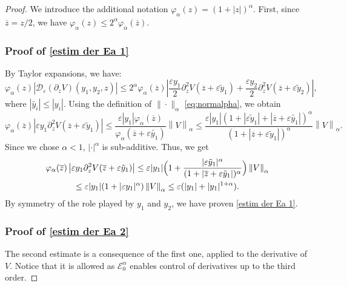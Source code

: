 \documentclass[10pt]{amsart}
\let\mathcal\mathscr
\theoremstyle{plain}
\theoremstyle{definition}
\newcommand{\D}{\mathcal{D}_\eps}
\let\eps\varepsilon
\newcommand{\abs}[1]{\left\lvert#1\right\rvert}
\newcommand{\nalph}[1]{\left\lVert#1\right\rVert_\alpha}
\newcommand{\Eaz}{\mathcal{E}^\alpha_0}
\newcommand{\bz}{\overline{z}}
\newcommand{\vphia}{\varphi_\alpha}
\begin{document}
\begin{proof}
We introduce the additional notation $\vphia(z) = (1+|z|)^\alpha$. First, since \hbox{$\bz=z/2$}, we have $\vphia(z) \leq 2^{\alpha} \vphia(\bz)$.

\subsubsection*{Proof of \eqref{estim der Ea 1}}
By Taylor expansions, we have:
\begin{equation*}
\vphia(z) \left| \D(\partial_z V)(y_1,y_2,z)\right| \leq 2^{\alpha} \vphia(\bz) \left| \dfrac{\eps y _1}{2} \partial^2_z V(\bz+\eps \tilde y_1)+\dfrac{\eps y_2 }{2} \partial^2_z V(\bz+\eps \tilde y_2) \right|,
\end{equation*}
where $\abs{ \tilde{y_i} } \leq \abs{y_i}$.
Using the definition of $\|\cdot \|_\alpha$ \eqref{eq:normalpha}, we obtain
\begin{equation*}
\vphia(\bz) \left| \eps y _1 \partial^2_z V(\bz+\eps \tilde y_1) \right| \leq \dfrac{\eps |y_1 | \vphia(\bz)} {\vphia(\bz+\eps \tilde{y_1}) }\nalph{V} \leq \dfrac{\eps |y_1 | (1+|\eps \tilde y_1| + |\bz + \eps \tilde{y_1} |)^\alpha}{(1+|\bz+\eps \tilde y_1|)^\alpha}\nalph{V}.
\end{equation*}
Since we chose $\alpha < 1$, $|\cdot|^\alpha$ is sub-additive. Thus, we get
\begin{multline*}
\vphia(\bz) \left| \eps y _1 \partial^2_z V(\bz+\eps \tilde y_1) \right| \leq \eps |y_1 | \Bigl (1 + \dfrac{|\eps \tilde y_1|^\alpha}{(1+|\bz+\eps \tilde y_1|)^\alpha} \Bigr)\nalph{V} \\
\leq \eps |y_1 | (1 + |\eps y_1|^\alpha)\nalph{V} \leq \eps (|y_1|+|y_1|^{1+\alpha}).
\end{multline*}
By symmetry of the role played by $y_1$ and $y_2$, we have proven \cref{estim der Ea 1}.

\subsubsection*{Proof of \eqref{estim der Ea 2}}
The second estimate is a consequence of the first one, applied to the derivative of $V$. Notice that it is allowed as $\Eaz$ enables control of derivatives up to the third order.


\end{proof}
\end{document}
